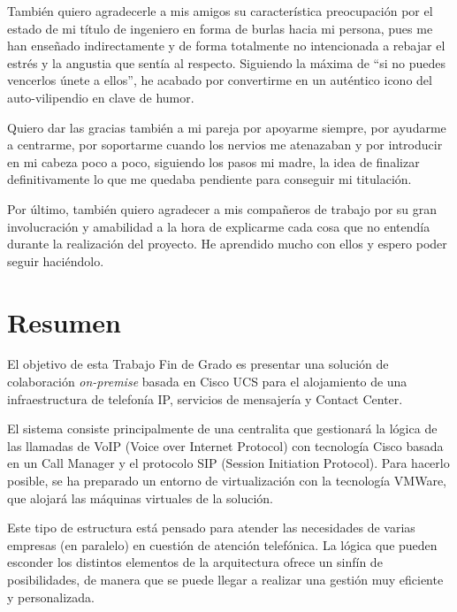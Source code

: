 \documentclass[a4paper, 12pt]{book}
\begin{document}
También quiero agradecerle a mis amigos su característica preocupación por el estado de mi título de ingeniero en forma de burlas hacia mi persona, pues me han enseñado indirectamente y de forma totalmente no intencionada a rebajar el estrés y la angustia que sentía al respecto. 
Siguiendo la máxima de ``si no puedes vencerlos únete a ellos'', he acabado por convertirme en un auténtico icono del auto-vilipendio en clave de humor.

Quiero dar las gracias también a mi pareja por apoyarme siempre, por ayudarme a centrarme, por soportarme cuando los nervios me atenazaban y por introducir en mi cabeza poco a poco, siguiendo los pasos mi madre, la idea de finalizar definitivamente lo que me quedaba pendiente para conseguir mi titulación.

Por último, también quiero agradecer a mis compañeros de trabajo por su gran involucración y amabilidad a la hora de explicarme cada cosa que no entendía durante la realización del proyecto. He aprendido mucho con ellos y espero poder seguir haciéndolo.

\chapter*{Resumen}

El objetivo de esta Trabajo Fin de Grado es presentar una solución de colaboración \emph{on-premise} basada en Cisco UCS para el alojamiento de una infraestructura de telefonía IP, servicios de mensajería y Contact Center.

El sistema consiste principalmente de una centralita que gestionará la lógica de las llamadas de VoIP (Voice over Internet Protocol) con tecnología Cisco basada en un Call Manager y el protocolo SIP (Session Initiation Protocol).
Para hacerlo posible, se ha preparado un entorno de virtualización con la tecnología VMWare, que alojará las máquinas virtuales de la solución.

Este tipo de estructura está pensado para atender las necesidades de varias empresas (en paralelo) en cuestión de atención telefónica. La lógica que pueden esconder los distintos elementos de la arquitectura ofrece un sinfín de posibilidades, de manera que se puede llegar a realizar una gestión muy eficiente y personalizada.
\end{document}

